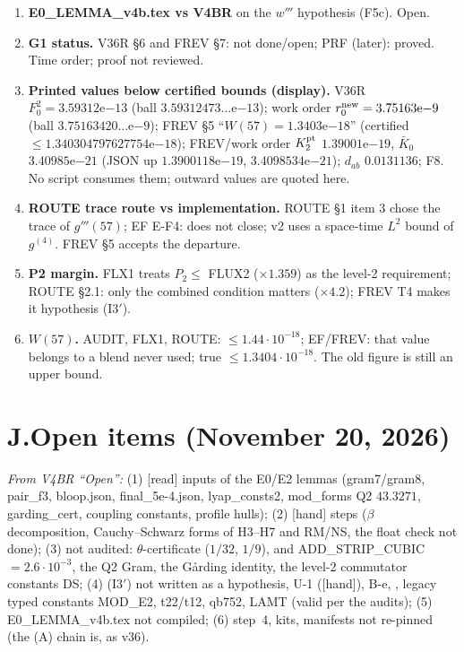 \documentclass[10pt]{article}
\newcommand{\fn}[1]{\texttt{\detokenize{#1}}}
\newcommand{\hand}{\textup{[hand]}}
\newcommand{\rdlab}{\textup{[read]}}
\begin{document}
\begin{enumerate}
\item \textbf{E0\_LEMMA\_v4b.tex vs V4BR} on the $w'''$ hypothesis (F5c). Open.
\item \textbf{G1 status.} V36R \S6 and FREV \S7: not done/open; PRF (later): proved. Time order; proof not reviewed.
\item \textbf{Printed values below certified bounds (display).} V36R $F_0^2=3.59312\mathrm{e}{-13}$ (ball $3.59312473\ldots\mathrm{e}{-13}$); work order $r_0^{\rm new}=3.75163\mathrm{e}{-9}$ (ball $3.75163420\ldots\mathrm{e}{-9}$); FREV \S5 ``$W(57)=1.3403\mathrm{e}{-18}$'' (certified $\le1.340304797627754\mathrm{e}{-18}$); FREV/work order $K_2^{\rm pt}$ $1.39001\mathrm{e}{-19}$, $\bar K_0$ $3.40985\mathrm{e}{-21}$ (JSON up $1.3900118\mathrm{e}{-19}$, $3.4098534\mathrm{e}{-21}$); $d_{ab}$ $0.0131136$; F8. No script consumes them; outward values are quoted here.
\item \textbf{ROUTE trace route vs implementation.} ROUTE \S1 item 3 chose the trace of $g'''(57)$; EF E-F4: does not close; v2 uses a space-time $L^2$ bound of $g^{(4)}$. FREV \S5 accepts the departure.
\item \textbf{P2 margin.} FLX1 treats $P_2\le$ FLUX2 ($\times1.359$) as the level-2 requirement; ROUTE \S2.1: only the combined condition matters ($\times4.2$); FREV T4 makes it hypothesis (I3$'$).
\item \textbf{$W(57)$.} AUDIT, FLX1, ROUTE: $\le1.44\cdot10^{-18}$; EF/FREV: that value belongs to a blend never used; true $\le1.3404\cdot10^{-18}$. The old figure is still an upper bound.
\end{enumerate}

\section*{J.\quad Open items (November 20, 2026)}
\textit{From V4BR ``Open'':} (1) \rdlab{} inputs of the E0/E2 lemmas (gram7/gram8, pair\_f3, bloop.json, final\_5e-4.json, lyap\_consts2, mod\_forms Q2 $43.3271$, garding\_cert, coupling constants, profile hulls); (2) \hand{} steps ($\beta$ decomposition, Cauchy--Schwarz forms of H3--H7 and RM/NS, the float check not done); (3) not audited: $\theta$-certificate ($1/32$, $1/9$), \fn{cubic_E0fine} and ADD\_STRIP\_CUBIC $=2.6\cdot10^{-3}$, the Q2 Gram, the G\aa rding identity, the level-2 commutator constants DS; (4) (I3$'$) not written as a hypothesis, U-1 (\hand), B-e, \fn{ei_lemma_v4.tex}, legacy typed constants MOD\_E2, t22/t12, qb752, LAMT (valid per the audits); (5) E0\_LEMMA\_v4b.tex not compiled; (6) step~4, kits, manifests not re-pinned (the (A) chain is, as v36).
\end{document}
